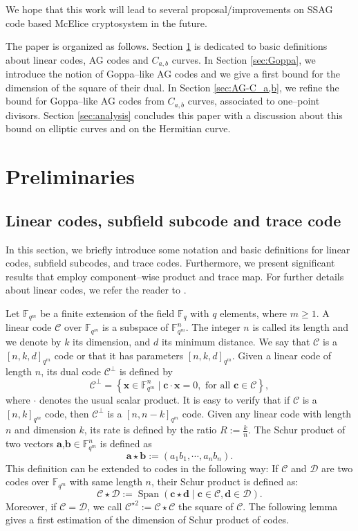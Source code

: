 \documentclass[a4paper]{article}
\theoremstyle{definition}
\theoremstyle{remark}
\newcommand{\calC}{\mathcal{C}}
\newcommand{\calD}{\mathcal{D}}
\newcommand{\fqm}{\mathbb{F}_{q^m}}
\newcommand{\fq}{\mathbb{F}_{q}}
\newcommand{\Span}[1]{\operatorname{Span}\left(#1\right)}
\begin{document}
We hope that this work will lead to several proposal/improvements on SSAG code based McElice cryptosystem in the future.

\medskip

The paper is organized as follows. Section \ref{sec:preli} is dedicated to basic definitions about linear codes, AG codes and $C_{a,b}$ curves. In Section \ref{sec:Goppa}, we introduce the notion of Goppa--like AG codes and we give a first bound for the dimension of the square of their dual. In Section \ref{sec:AG-C_a,b}, we refine the bound for Goppa--like AG codes from $C_{a,b}$ curves, associated to one--point divisors. Section \ref{sec:analysis} concludes this paper with a discussion about this bound on elliptic curves and on the Hermitian curve.

\section{Preliminaries}\label{sec:preli}
\subsection{Linear codes, subfield subcode and trace code}

In this section, we briefly introduce some notation and basic definitions for linear codes, subfield subcodes, and trace codes. Furthermore, we present significant results that employ component--wise product and trace map. For further details about linear codes, we refer the reader to \cite{MS86}.

\noindent Let $\fqm$ be a finite extension of the field $\fq$ with $q$ elements, where $m \geq 1$. A linear code $\calC$ over $\fqm$ is a subspace of $\fqm^n$. The integer $n$ is called its length and we denote by $k$ its dimension, and $d$ its minimum distance. We say that $\calC$ is a $[n,k,d]_{q^m}$ code or that it has parameters $[n,k,d]_{q^m}$. Given a linear code of length $n$, its dual code $\calC^{\perp}$ is defined by 
\[\calC^{\perp}=\left\lbrace \mathbf{x} \in \fqm^n \mid \mathbf{c} \cdot \mathbf{x}=0, \text{ for all } \mathbf{c} \in \calC \right\rbrace,\]  
where $\cdot$ denotes the usual scalar product. It is easy to verify that if $\calC$ is a $[n,k]_{q^m}$ code, then $\calC^{\perp}$ is a $[n,n-k]_{q^m}$ code.
Given any linear code with length $n$ and dimension $k$, its rate is defined by the ratio $R := \frac{k}{n}$.
The Schur product of two vectors $\mathbf{a}$,$\mathbf{b} \in \fqm^n$ is defined as 
\[ \mathbf{a} \star \mathbf{b} := (a_1b_1,\cdots,a_nb_n). \]
This definition can be extended to codes in the following way: If $\calC$ and $\calD$ are two codes over $\fqm$ with same length $n$, their Schur product is defined as:
\[ \calC \star \calD := \Span{\mathbf{c} \star \mathbf{d} \mid \mathbf{c} \in \calC, \mathbf{d} \in \calD}. \]
Moreover, if $\calC = \calD$, we call $\calC^{\star 2} := \calC \star \calC$ the square of $\calC$. The following lemma gives a first estimation of the dimension of Schur product of codes.
\end{document}
